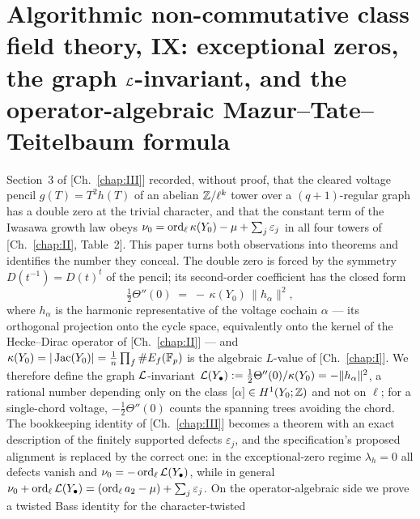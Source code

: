 \chapter[\texorpdfstring{IX. Exceptional zeros, the graph $\cL$-invariant, and the operator-algebraic
Mazur--Tate--Teitelbaum formula}{IX. Exceptional zeros, the graph L-invariant, and the operator-algebraic Mazur-Tate-Teitelbaum formula}]{\texorpdfstring{Algorithmic non-commutative class field theory, IX: exceptional zeros, the graph $\cL$-invariant, and the operator-algebraic
Mazur--Tate--Teitelbaum formula}{Algorithmic non-commutative class field theory, IX: exceptional zeros, the graph L-invariant, and the operator-algebraic Mazur-Tate-Teitelbaum formula}}\label{chap:IX}
\begin{chapterabstract}
Section~3 of [Ch.~\ref{chap:III}] recorded, without proof, that the cleared voltage pencil
$g(T)=T^{2}h(T)$ of an abelian $\mathbb{Z}/\ell^{k}$ tower over a $(q{+}1)$-regular graph has a
double zero at the trivial character, and that the constant term of the Iwasawa growth
law obeys $\nu_0=\operatorname{ord}_\ell\kappa(Y_0)-\mu+\sum_j\varepsilon_j$ in all four towers of
[Ch.~\ref{chap:II}, Table~2]. This paper turns both observations into theorems and identifies the
number they conceal. The double zero is forced by the symmetry $D(t^{-1})=D(t)^{t}$ of
the pencil; its second-order coefficient has the closed form
\[
\tfrac12\Theta''(0)\;=\;-\,\kappa(Y_0)\,\|h_\alpha\|^{2},
\]
where $h_\alpha$ is the harmonic representative of the voltage cochain $\alpha$ --- its
orthogonal projection onto the cycle space, equivalently onto the kernel of the
Hecke--Dirac operator of [Ch.~\ref{chap:II}] --- and $\kappa(Y_0)=|\operatorname{Jac}(Y_0)|=\frac1n\prod_f\#E_f(\mathbb{F}_p)$
is the algebraic $L$-value of [Ch.~\ref{chap:I}]. We therefore define the graph $\cL$-invariant
$\mathcal{L}(Y_\bullet):=\tfrac12\Theta''(0)/\kappa(Y_0)=-\|h_\alpha\|^{2}$, a rational number
depending only on the class $[\alpha]\in H^{1}(Y_0;\mathbb{Z})$ and not on $\ell$; for a
single-chord voltage, $-\tfrac12\Theta''(0)$ counts the spanning trees avoiding the
chord. The bookkeeping identity of [Ch.~\ref{chap:III}] becomes a theorem with an exact description of
the finitely supported defects $\varepsilon_j$, and the specification's proposed
alignment is replaced by the correct one: in the exceptional-zero regime $\lambda_h=0$
all defects vanish and $\nu_0=-\operatorname{ord}_\ell\mathcal{L}(Y_\bullet)$, while in general
$\nu_0+\operatorname{ord}_\ell\mathcal{L}(Y_\bullet)=(\operatorname{ord}_\ell a_2-\mu)+\sum_j\varepsilon_j$. On the
operator-algebraic side we prove a twisted Bass identity for the character-twisted

\end{chapterabstract}
